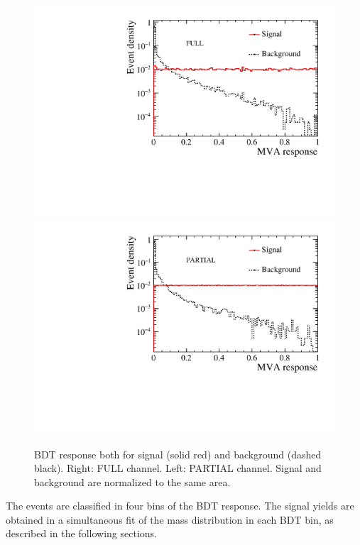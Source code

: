 \begin{figure} [htb!]
\begin{center}
\includegraphics[scale=0.38]{figs/Kspi0MuMu/BDT_sig_vs_bkg_FULL.pdf}%
\includegraphics[scale=0.38]{figs/Kspi0MuMu/BDT_sig_vs_bkg_PARTIAL.pdf}%
\caption{BDT response both for signal (solid red) and background (dashed black). Right: FULL channel. Left: PARTIAL channel.  Signal and background are normalized to the same area. \label{fig:BDT}}
\end{center}
\end{figure}


The events are classified in four bins of the BDT response. The signal yields are obtained in a simultaneous fit 
of the mass distribution in each BDT bin, as described in the following sections.
